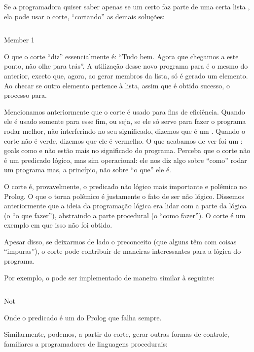 Se a programadora quiser saber apenas se um certo  faz parte de
uma certa lista , ela pode usar o corte, ``cortando'' as
demais soluções:

\begin{listing}
  \inputminted{prolog}{../Exemplos/Cap4/prog2_member2.pl}
  \caption{Member 1}
\end{listing}

O que o corte ``diz'' essencialmente é: ``Tudo bem. Agora que chegamos
a este ponto, não olhe para trás''. A utilização desse novo programa
para  é o mesmo do anterior, exceto que, agora, ao
gerar membros da lista, só é gerado um elemento. Ao checar se outro
elemento pertence à lista, assim que é obtido sucesso, o processo
para.

Mencionamos anteriormente que o corte é usado para fins de
eficiência. Quando ele é usado somente para esse fim, ou seja, se ele
só serve para fazer o programa rodar melhor, não interferindo no seu
significado, dizemos que é um .  Quando o corte
não é verde, dizemos que ele é vermelho. O que acabamos de ver foi um
: goals como  e
 não estão mais no significado do programa. Perceba que
o corte não é um predicado lógico, mas sim operacional: ele nos diz
algo sobre ``como'' rodar um programa mas, a princípio, não sobre ``o
que'' ele é.

O corte é, provavelmente, o predicado não lógico mais importante e
polêmico no Prolog. O que o torna polêmico é justamente o fato de ser
não lógico. Dissemos anteriormente que a ideia da programação lógica
era lidar com a parte da lógica (o ``o que fazer''), abstraindo a
parte procedural (o ``como fazer''). O corte é um exemplo em que isso
não foi obtido.

Apesar disso, se deixarmos de lado o preconceito (que alguns têm com
coisas ``impuras''), o corte pode
contribuir de maneiras interessantes para a lógica do programa.

Por exemplo, o  pode ser implementado de maneira similar
à seguinte:

\begin{listing}
  \inputminted{prolog}{../Exemplos/Cap4/prog3_not.pl}
  \caption{Not}
\end{listing}

Onde o predicado  é um  do Prolog que
falha sempre.

Similarmente, podemos, a partir do corte, gerar outras formas de
controle, familiares a programadores de linguagens procedurais:

